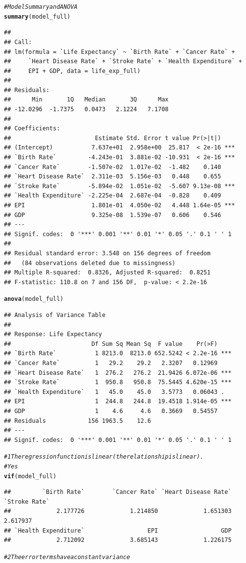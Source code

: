 \documentclass{article}\usepackage[]{graphicx}\usepackage[]{color}
\makeatletter
\newcommand{\hlcom}[1]{\textcolor[rgb]{0.678,0.584,0.686}{\textit{#1}}}%
\newcommand{\hlstd}[1]{\textcolor[rgb]{0.345,0.345,0.345}{#1}}%
\newcommand{\hlkwd}[1]{\textcolor[rgb]{0.737,0.353,0.396}{\textbf{#1}}}%
\newenvironment{kframe}{%
 \def\at@end@of@kframe{}%
 \ifinner\ifhmode%
  \def\at@end@of@kframe{\end{minipage}}%
  \begin{minipage}{\columnwidth}%
 \fi\fi%
 \def\FrameCommand##1{\hskip\@totalleftmargin \hskip-\fboxsep
 \colorbox{shadecolor}{##1}\hskip-\fboxsep
     \hskip-\linewidth \hskip-\@totalleftmargin \hskip\columnwidth}%
 \MakeFramed {\advance\hsize-\width
   \@totalleftmargin\z@ \linewidth\hsize
   \@setminipage}}%
 {\par\unskip\endMakeFramed%
 \at@end@of@kframe}
\newenvironment{knitrout}{}{} %
\makeatother
\begin{document}
\begin{knitrout}
\begin{kframe}
\begin{alltt}
\hlcom{# Model Summary and ANOVA}
\hlkwd{summary}\hlstd{(model_full)}
\end{alltt}
\begin{verbatim}
## 
## Call:
## lm(formula = `Life Expectancy` ~ `Birth Rate` + `Cancer Rate` + 
##     `Heart Disease Rate` + `Stroke Rate` + `Health Expenditure` + 
##     EPI + GDP, data = life_exp_full)
## 
## Residuals:
##      Min       1Q   Median       3Q      Max 
## -12.0296  -1.7375   0.0473   2.1224   7.1708 
## 
## Coefficients:
##                        Estimate Std. Error t value Pr(>|t|)    
## (Intercept)           7.637e+01  2.958e+00  25.817  < 2e-16 ***
## `Birth Rate`         -4.243e-01  3.881e-02 -10.931  < 2e-16 ***
## `Cancer Rate`        -1.507e-02  1.017e-02  -1.482    0.140    
## `Heart Disease Rate`  2.311e-03  5.156e-03   0.448    0.655    
## `Stroke Rate`        -5.894e-02  1.051e-02  -5.607 9.13e-08 ***
## `Health Expenditure` -2.225e-04  2.687e-04  -0.828    0.409    
## EPI                   1.801e-01  4.050e-02   4.448 1.64e-05 ***
## GDP                   9.325e-08  1.539e-07   0.606    0.546    
## ---
## Signif. codes:  0 '***' 0.001 '**' 0.01 '*' 0.05 '.' 0.1 ' ' 1
## 
## Residual standard error: 3.548 on 156 degrees of freedom
##   (84 observations deleted due to missingness)
## Multiple R-squared:  0.8326,	Adjusted R-squared:  0.8251 
## F-statistic: 110.8 on 7 and 156 DF,  p-value: < 2.2e-16
\end{verbatim}
\begin{alltt}
\hlkwd{anova}\hlstd{(model_full)}
\end{alltt}
\begin{verbatim}
## Analysis of Variance Table
## 
## Response: Life Expectancy
##                       Df Sum Sq Mean Sq  F value    Pr(>F)    
## `Birth Rate`           1 8213.0  8213.0 652.5242 < 2.2e-16 ***
## `Cancer Rate`          1   29.2    29.2   2.3207   0.12969    
## `Heart Disease Rate`   1  276.2   276.2  21.9426 6.072e-06 ***
## `Stroke Rate`          1  950.8   950.8  75.5445 4.620e-15 ***
## `Health Expenditure`   1   45.0    45.0   3.5773   0.06043 .  
## EPI                    1  244.8   244.8  19.4518 1.914e-05 ***
## GDP                    1    4.6     4.6   0.3669   0.54557    
## Residuals            156 1963.5    12.6                       
## ---
## Signif. codes:  0 '***' 0.001 '**' 0.01 '*' 0.05 '.' 0.1 ' ' 1
\end{verbatim}
\begin{alltt}
\hlcom{# 1 The regression function is linear (the relationship is linear).}
\hlcom{# Yes }
\hlkwd{vif}\hlstd{(model_full)}
\end{alltt}
\begin{verbatim}
##         `Birth Rate`        `Cancer Rate` `Heart Disease Rate`        `Stroke Rate` 
##             2.177726             1.214850             1.651303             2.617937 
## `Health Expenditure`                  EPI                  GDP 
##             2.712092             3.685143             1.226175
\end{verbatim}
\begin{alltt}
\hlcom{# 2 The error terms have a constant variance}


\end{alltt}
\end{kframe}
\end{knitrout}
\end{document}
